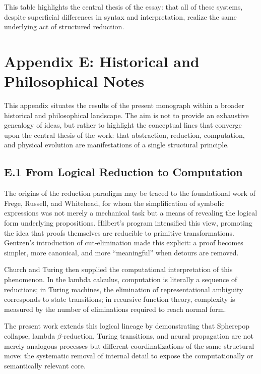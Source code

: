 \documentclass[12pt,letterpaper]{article}
\begin{document}
This table highlights the central thesis of the essay: that all of these systems,
despite superficial differences in syntax and interpretation, realize the same
underlying act of structured reduction.

\section{Appendix E: Historical and Philosophical Notes}

This appendix situates the results of the present monograph within a broader 
historical and philosophical landscape.  The aim is not to provide an exhaustive 
genealogy of ideas, but rather to highlight the conceptual lines that converge 
upon the central thesis of the work: that abstraction, reduction, computation, 
and physical evolution are manifestations of a single structural principle.

\subsection*{E.1 From Logical Reduction to Computation}

The origins of the reduction paradigm may be traced to the foundational work of 
Frege, Russell, and Whitehead, for whom the simplification of symbolic expressions 
was not merely a mechanical task but a means of revealing the logical form 
underlying propositions.  Hilbert’s program intensified this view, promoting the 
idea that proofs themselves are reducible to primitive transformations.  
Gentzen’s introduction of cut-elimination made this explicit: a proof becomes 
simpler, more canonical, and more ``meaningful'' when detours are removed.

Church and Turing then supplied the computational interpretation of this 
phenomenon.  In the lambda calculus, computation is literally a sequence of 
reductions; in Turing machines, the elimination of representational ambiguity 
corresponds to state transitions; in recursive function theory, complexity is 
measured by the number of eliminations required to reach normal form.

The present work extends this logical lineage by demonstrating that 
Spherepop collapse, lambda $\beta$-reduction, Turing transitions, and neural 
propagation are not merely analogous processes but different coordinatizations of 
the same structural move: the systematic removal of internal detail to expose the 
computationally or semantically relevant core.
\end{document}
